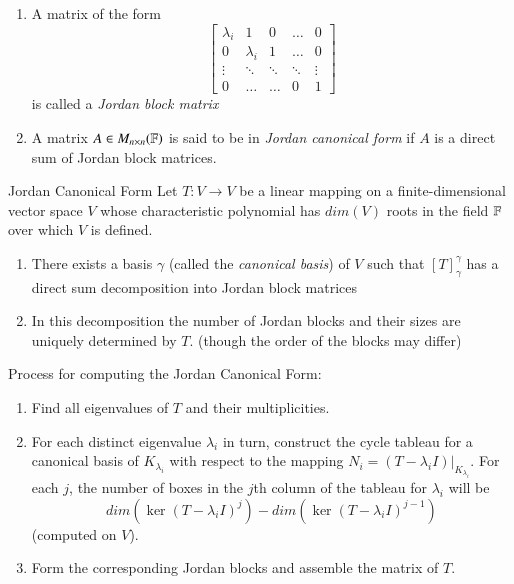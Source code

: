 \documentclass[12pt]{report}
\begin{document}
\begin{defn}{}{}
    \leavevmode
    \begin{enumerate}
        \item A matrix of the form $$\begin{bmatrix} \lambda_i & 1 & 0 & \hdots & 0 \\ 0 & \lambda_i & 1 & \hdots & 0 \\ \vdots & \ddots & \ddots & \ddots & \vdots \\ 0 & \hdots & \hdots & 0 & 1 \end{bmatrix}$$ is called a \emph{Jordan block matrix}
        \item A matrix $A \in M_{n\times n}(\mathbb F)$ is said to be in \emph{Jordan canonical form} if $A$ is a direct sum of Jordan block matrices.
    \end{enumerate}
\end{defn}


\begin{thm}{Jordan Canonical Form}{}
    Let $T:V\rightarrow V$ be a linear mapping on a finite-dimensional vector space $V$ whose characteristic polynomial has $dim(V)$ roots in the field $\mathbb F$ over which $V$ is defined. \begin{enumerate}
        \item There exists a basis $\gamma$ (called the \emph{canonical basis}) of $V$ such that $[T]_{\gamma}^{\gamma}$ has a direct sum decomposition into Jordan block matrices
        \item In this decomposition the number of Jordan blocks and their sizes are uniquely determined by $T$. (though the order of the blocks may differ)
    \end{enumerate}
\end{thm}

\begin{rmk}{}{}
    Process for computing the Jordan Canonical Form:
    \begin{enumerate}
        \item Find all eigenvalues of $T$ and their multiplicities.
        \item For each distinct eigenvalue $\lambda_i$ in turn, construct the cycle tableau for a canonical basis of $K_{\lambda_i}$ with respect to the mapping $N_i = (T-\lambda_i I)\rvert_{K_{\lambda_i}}$. For each $j$, the number of boxes in the $j$th column of the tableau for $\lambda_i$ will be $$dim(\ker(T-\lambda_iI)^j) - dim(\ker(T-\lambda_iI)^{j-1})$$
        (computed on $V$). 
        \item Form the corresponding Jordan blocks and assemble the matrix of $T$.
    \end{enumerate}
\end{rmk}
\end{document}
